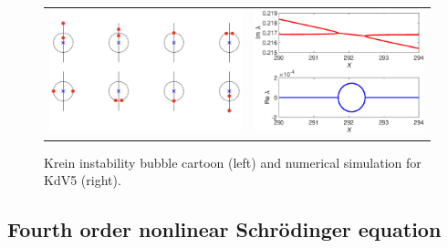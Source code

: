 \documentclass[12pt,reqno,oneside,hidelinks]{article}
\begin{document}
\begin{figure}
\begin{center}
\begin{tabular}{cc}
\includegraphics[width=9cm]{images/KreinBubbleCartoonSS2.png} & 
\includegraphics[width=8cm]{images/kreinbubble1.eps}
\end{tabular}
\end{center}
\caption{Krein instability bubble cartoon (left) and numerical simulation for KdV5 (right).}
\label{fig:kreinbubble1}
\end{figure}

\subsection*{Fourth order nonlinear Schr\"odinger equation}
\end{document}
